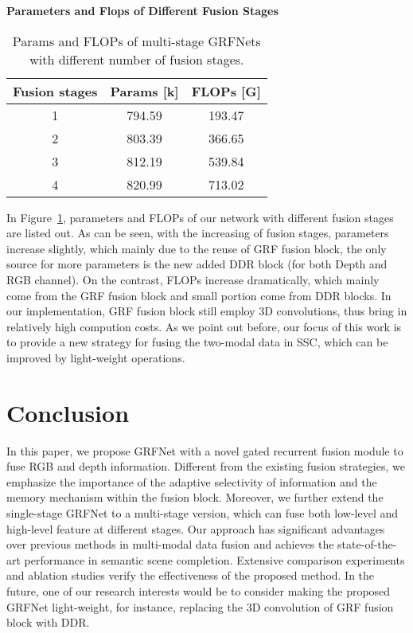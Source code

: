 \documentclass[10pt,twocolumn,letterpaper]{article}
\begin{document}
\noindent
\textbf{
Parameters and Flops of Different Fusion Stages}
\begin{table}[t]
\begin{center}
\scalebox{1.0}
{
\begin{tabular} {c|c|c} 
\hline

Fusion stages & Params [k] & FLOPs [G] \\ \hline
  1   &   794.59 	&   193.47  \\   
  2   &   803.39	&  	366.65  \\
  3   &   812.19 	&   539.84  \\ 
  4   &   820.99   &    713.02  \\ 
\hline
\end{tabular}
}
\caption{Params and FLOPs of multi-stage GRFNets with different number of fusion stages.}
\vspace{-0.5cm}
\label{tab:ParamsFLOPs-ours}
\end{center}
\end{table}

In Figure~\ref{tab:ParamsFLOPs-ours}, parameters and FLOPs of our network with different fusion stages are listed out. As can be seen, with the increasing of fusion stages, parameters increase slightly, which mainly due to the reuse of GRF fusion block, the only source for more parameters is the new added DDR block (for both Depth and RGB channel). On the contrast, FLOPs increase dramatically, which mainly come from the GRF fusion block and small portion come from DDR blocks. In our implementation, GRF fusion block still employ 3D convolutions, thus bring in relatively high compution costs. As we point out before, our focus of this work is to provide a new strategy for fusing the two-modal data in SSC, which can be improved by light-weight operations.   
\section{Conclusion}
In this paper, we propose GRFNet with a novel gated recurrent fusion module to fuse RGB and depth information.
Different from the existing fusion strategies, we emphasize the importance of the adaptive selectivity of information and the memory mechanism within the fusion block. 
Moreover, we further extend the single-stage GRFNet to a multi-stage version, which can fuse both low-level and high-level feature at different stages.
Our approach has significant advantages over previous methods in multi-modal data fusion and achieves the state-of-the-art performance in semantic scene completion.
Extensive comparison experiments and ablation studies verify the effectiveness of the proposed method. In the future, one of our research interests would be to consider making the proposed GRFNet light-weight, for instance, replacing the 3D convolution of GRF fusion block with DDR. 
\end{document}
